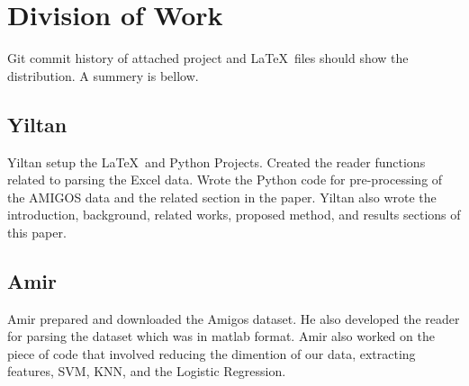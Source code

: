 \section{Division of Work}
\label{sec:division_of_work}
Git commit history of attached project and
\LaTeX~files should show the distribution.
A summery is bellow.

\subsection{Yiltan}
Yiltan setup the \LaTeX~and Python Projects.
Created the reader functions related to parsing the Excel data.
Wrote the Python code for pre-processing of the AMIGOS data
and the related section in the paper.
Yiltan also wrote the introduction, background, related works,
proposed method, and results sections of this paper.

\subsection{Amir}
Amir prepared and downloaded the Amigos dataset.
He also developed the reader for parsing the dataset
which was in matlab format.
Amir also worked on the piece of code that involved reducing the dimention of our data, extracting features, SVM, KNN, and the Logistic Regression.
